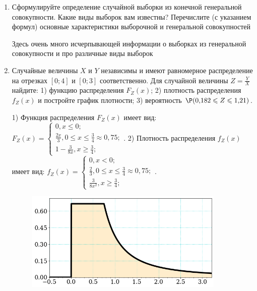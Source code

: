 \documentclass[a4paper,14pt]{article}
\begin{document}
\begin{enumerate}


\item


Сформулируйте определение случайной выборки из конечной генеральной совокупности. Какие
виды выборок вам известны? Перечислите (с указанием формул) основные характеристики выборочной и генеральной совокупностей




Здесь очень много исчерпывающей информации о выборках из генеральной совокупности и про различные виды выборок


\item



Случайные величины $X$ и $Y$ независимы и имеют равномерное
распределение на отрезках $[0;4]$ и $[0;3]$ соответственно. Для случайной величины $Z=\frac{Y}{X}$ найдите: 
1) функцию распределения $F_Z(x)$;
2) плотность распределения $f_Z(x)$ и постройте график плотности;
3) вероятность $\P(0,\!182\leqslant Z\leqslant 1,\!21)$.




1) Функция распределения $F_Z(x)$ имеет вид:
$
F_Z(x)=\left\{
\begin{array}{l}
0, x\leqslant 0;\\
\frac{2 x}{3}, 0\leqslant x\leqslant \frac{3}{4}\approx 0,\!75;\\
1 - \frac{3}{8 x}, x\geqslant\frac{3}{4};
\end{array}.
\right.
$
2) Плотность распределения $f_Z(x)$ имеет вид:
$
f_Z(x)=\left\{
\begin{array}{l}
0, x<0;\\
\frac{2}{3}, 0\leqslant x\leqslant \frac{3}{4}\approx 0,\!75;\\
\frac{3}{8 x^{2}}, x\geqslant\frac{3}{4};
\end{array}.
\right.
$


\begin{figure}[H]
    \includegraphics[width=0.9\textwidth]{2_53d11}
\end{figure}



\end{enumerate}
\end{document}
